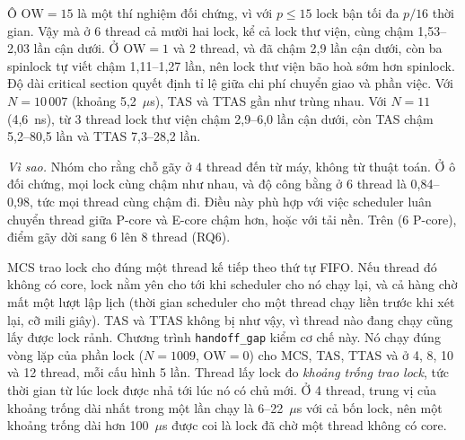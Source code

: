 Ô $\mathrm{OW} = 15$ là một thí nghiệm đối chứng, vì với $p \le 15$ lock bận tối đa $p/16$ thời gian.
Vậy mà ở 6 thread cả mười hai lock, kể cả lock thư viện, cùng chậm 1,53--2,03 lần cận dưới. Ở
$\mathrm{OW} = 1$ và 2 thread,  và  đã chậm 2,9 lần cận dưới,
còn ba spinlock tự viết chậm 1,11--1,27 lần, nên lock thư viện bão hoà sớm hơn spinlock. Độ dài critical
section quyết định tỉ lệ giữa chi phí chuyển giao và phần việc. Với $N = 10\,007$ (khoảng 5,2~$\mu$s),
TAS và TTAS gần như trùng nhau. Với $N = 11$ (4,6~ns), từ 3 thread lock thư viện chậm 2,9--6,0 lần cận
dưới, còn TAS chậm 5,2--80,5 lần và TTAS 7,3--28,2 lần.

\emph{Vì sao.} Nhóm cho rằng chỗ gãy ở 4 thread đến từ máy, không từ thuật toán. Ở ô đối chứng, mọi
lock cùng chậm như nhau, và độ công bằng ở 6 thread là 0,84--0,98, tức mọi thread cùng chậm đi. Điều này
phù hợp với việc scheduler luân chuyển thread giữa P-core và E-core chậm hơn, hoặc với tải nền. Trên
 (6 P-core), điểm gãy dời sang 6 lên 8 thread (RQ6).

MCS trao lock cho đúng một thread kế tiếp theo thứ tự FIFO. Nếu thread đó không có core, lock nằm yên
cho tới khi scheduler cho nó chạy lại, và cả hàng chờ mất một lượt lập lịch (thời gian scheduler cho
một thread chạy liền trước khi xét lại, cỡ mili giây). TAS và TTAS không bị như vậy, vì thread nào đang chạy cũng lấy được lock rảnh. Chương trình \texttt{handoff\_gap} kiểm cơ chế này.
Nó chạy đúng vòng lặp của phần lock ($N = 1009$, $\mathrm{OW} = 0$) cho MCS, TAS, TTAS và
 ở 4, 8, 10 và 12 thread, mỗi cấu hình 5 lần. Thread lấy lock đo \emph{khoảng trống
trao lock}, tức thời gian từ lúc lock được nhả tới lúc nó có chủ mới. Ở 4 thread, trung vị của khoảng
trống dài nhất trong một lần chạy là 6--22~$\mu$s với cả bốn lock, nên một khoảng trống dài hơn
100~$\mu$s được coi là lock đã chờ một thread không có core.

